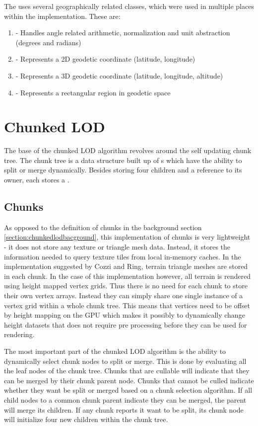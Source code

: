 The  uses several geographically related classes, which were used in multiple places within the implementation. These are:
\begin{enumerate}
	\item {} - Handles angle related arithmetic, normalization and unit abstraction (degrees and radians)
	\item {} - Represents a 2D geodetic coordinate (latitude, longitude)
	\item {} - Represents a 3D geodetic coordinate (latitude, longitude, altitude)
	\item {} - Represents a rectangular region in geodetic space
\end{enumerate}

\section{Chunked LOD}
The base of the chunked LOD algorithm revolves around the self updating chunk tree. The chunk tree is a data structure built up of s which have the ability to split or merge dynamically. Besides storing four  children and a reference to its  owner, each  stores a .

\subsection{Chunks}
As opposed to the definition of chunks in the background section \ref{section:chunkedlodbacground}, this implementation of chunks is very lightweight - it does not store any texture or triangle mesh data. Instead, it stores the information needed to query texture tiles from local in-memory caches. In the implementation suggested by Cozzi and Ring, terrain triangle meshes are stored in each chunk. In the case of this implementation however, all terrain is rendered using height mapped vertex grids. Thus there is no need for each chunk to store their own vertex arrays. Instead they can simply share one single instance of a vertex grid within a whole chunk tree. This means that vertices need to be offset by height mapping on the GPU which makes it possibly to dynamically change height datasets that does not require pre processing before they can be used for rendering.

The most important part of the chunked LOD algorithm is the ability to dynamically select chunk nodes to split or merge. This is done by evaluating all the leaf nodes of the chunk tree. Chunks that are cullable will indicate that they can be merged by their chunk parent node. Chunks that cannot be culled indicate whether they want be split or merged based on a chunk selection algorithm. If all child nodes to a common chunk parent indicate they can be merged, the parent will merge its children. If any chunk reports it want to be split, its chunk node will initialize four new children within the chunk tree.

